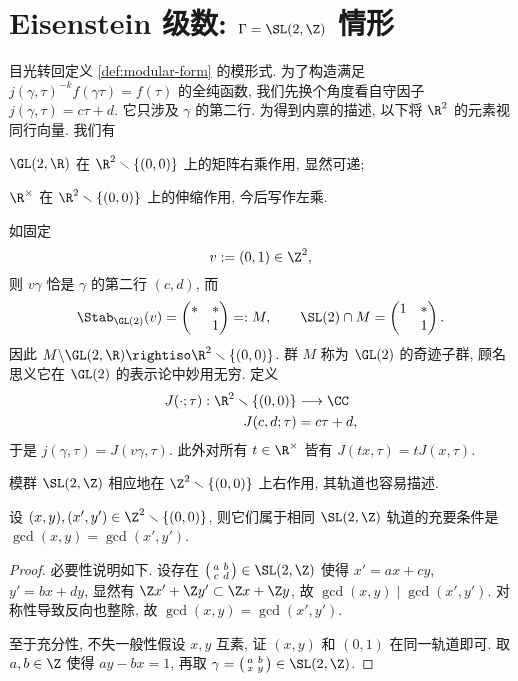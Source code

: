 \section{Eisenstein 级数: \texorpdfstring{$\Gamma=\SL(2,\Z)$}{Gamma = SL(2,Z)} 情形}\label{sec:Eisenstein-fulllevel}
目光转回定义 \ref{def:modular-form} 的模形式. 为了构造满足 $j(\gamma, \tau)^{-k} f(\gamma \tau) = f(\tau)$ 的全纯函数, 我们先换个角度看自守因子 $j(\gamma, \tau) = c\tau + d$. 它只涉及 $\gamma$ 的第二行. 为得到内禀的描述, 以下将 $\R^2$ 的元素视同行向量. 我们有
\begin{compactitem}
	\item $\GL(2,\R)$ 在 $\R^2 \smallsetminus \{(0,0)\}$ 上的矩阵右乘作用, 显然可递;
	\item $\R^\times$ 在 $\R^2 \smallsetminus \{(0,0)\}$ 上的伸缩作用, 今后写作左乘.
\end{compactitem}
如固定
\[ v := (0, 1) \in \Z^2, \]
则 $v\gamma$ 恰是 $\gamma$ 的第二行 $(c,d)$, 而
\[ \Stab_{\GL(2)}(v) = \begin{pmatrix} * & * \\ & 1 \end{pmatrix} =: M, \qquad \SL(2) \cap M = \begin{pmatrix} 1 & * \\ & 1 \end{pmatrix}. \]
因此 $M \backslash \GL(2,\R) \rightiso \R^2 \smallsetminus \{(0,0)\}$. 群 $M$ 称为 $\GL(2)$ 的奇迹子群, 顾名思义它在 $\GL(2)$ 的表示论中妙用无穷. 定义 
\begin{align*}
	J(\cdot; \tau): \R^2 \smallsetminus \{(0,0)\} & \longrightarrow \CC \\
	J(c,d; \tau) & = c\tau + d,
\end{align*}
于是 $j(\gamma, \tau)=J(v\gamma, \tau)$. 此外对所有 $t \in \R^\times$ 皆有 $J(tx, \tau) = t J(x, \tau)$.

模群 $\SL(2,\Z)$ 相应地在 $\Z^2 \smallsetminus \{(0,0)\}$ 上右作用, 其轨道也容易描述.
\begin{lemma}\label{prop:Eisenstein-orbit-aux}
	设 $(x,y), (x',y') \in \Z^2 \smallsetminus \{(0,0)\}$, 则它们属于相同 $\SL(2,\Z)$ 轨道的充要条件是 $\gcd(x,y)=\gcd(x',y')$.
\end{lemma}
\begin{proof}
	必要性说明如下. 设存在 $\twomatrix{a}{b}{c}{d} \in \SL(2,\Z)$ 使得 $x' = ax + cy$, $y' = bx + dy$, 显然有 $\Z x' + \Z y' \subset \Z x + \Z y$, 故 $\gcd(x, y) \mid \gcd(x', y')$. 对称性导致反向也整除, 故 $\gcd(x,y) = \gcd(x',y')$.
	
	至于充分性, 不失一般性假设 $x,y$ 互素, 证 $(x,y)$ 和 $(0,1)$ 在同一轨道即可. 取 $a, b \in \Z$ 使得 $ay - bx = 1$, 再取 $\gamma =\twomatrix{a}{b}{x}{y} \in \SL(2,\Z)$.
\end{proof}

